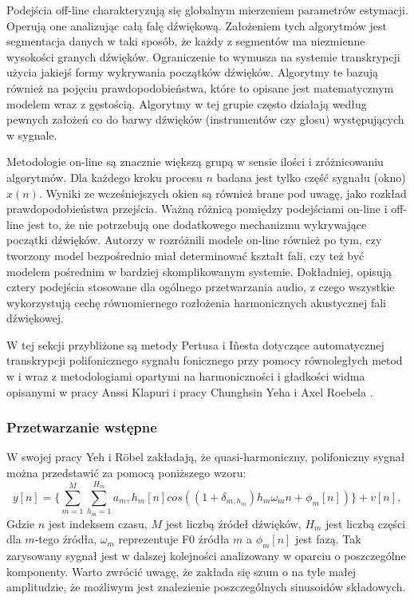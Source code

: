 \documentclass[12pt,a4paper,twoside]{mwart}
\begin{document}
Podejścia off-line charakteryzują się globalnym mierzeniem parametrów estymacji. Operują one analizując całą falę dźwiękową. Założeniem tych algorytmów jest segmentacja danych w taki sposób, że każdy z segmentów ma niezmienne wysokości granych dźwięków. Ograniczenie to wymusza na systemie transkrypcji użycia jakiejś formy wykrywania początków dźwięków. Algorytmy te bazują również na pojęciu prawdopodobieństwa, które to opisane jest matematycznym modelem wraz z gęstością. Algorytmy w tej grupie często działają według pewnych założeń co do barwy dźwięków (instrumentów czy głosu) występujących w sygnale.

Metodologie on-line są znacznie większą grupą w sensie ilości i zróżnicowaniu algorytmów. Dla każdego kroku procesu $n$ badana jest tylko część sygnału (okno) $x(n)$. Wyniki ze wcześniejszych okien są również brane pod uwagę, jako rozkład prawdopodobieństwa przejścia. Ważną różnicą pomiędzy podejściami on-line i off-line jest to, że nie potrzebują one dodatkowego mechanizmu wykrywające początki dźwięków. Autorzy w \cite[203-227]{Transcription:Anssi:SignalProcessingMethods} rozróżnili modele on-line również po tym, czy tworzony model bezpośrednio miał determinować kształt fali, czy też być modelem pośrednim w bardziej skomplikowanym systemie. Dokładniej, opisują cztery podejścia stosowane dla ogólnego przetwarzania audio, z czego wszystkie wykorzystują cechę równomiernego rozłożenia harmonicznych akustycznej fali dźwiękowej.

W tej sekcji przybliżone są metody Pertusa i Iñesta dotyczące automatycznej transkrypcji polifonicznego sygnału fonicznego przy pomocy równoległych metod w \cite{Transcription:Pertus:Inharmonicity} i \cite{Transcription:Pertus:Inharmonicity2} wraz z metodologiami opartymi na harmoniczności i gładkości widma opisanymi w pracy Anssi Klapuri \cite{Transcription:Klapuri:MultipleFundamentalFrequencyEstimation} i pracy Chunghsin Yeha i Axel Roebela \cite{Transcription:Yeh:JointEvaluationF0}.

\subsubsection{Przetwarzanie wstępne}\label{sec:preProcessing} 
W swojej pracy \cite[1]{Transcription:Yeh:JointEvaluationF0} Yeh i Röbel zakładają, że quasi-harmoniczny, polifoniczny sygnał można przedstawić za pomocą poniższego wzoru:
\begin{equation}\label{eq:Yeh:signal}
y[n] = \{ \sum_{m=1}^{M}\sum_{h_m = 1}^{H_m}a_m,h_m[n]cos((1 + \delta_{m,h_m})h_m\omega_m n + \phi_m [n])\} + v[n],
\end{equation}
Gdzie $n$ jest indeksem czasu, $M$ jest liczbą źródeł dźwięków, $H_m$ jest liczbą części dla $m$-tego źródła, $\omega_m$ reprezentuje F0 źródła $m$ a $\phi_m[n]$ jest fazą. Tak zarysowany sygnał jest w dalszej kolejności analizowany w oparciu o poszczególne komponenty. Warto zwrócić uwagę, że zakłada się szum o na tyle małej amplitudzie, że możliwym jest znalezienie poszczególnych sinusoidów składowych.
\end{document}
